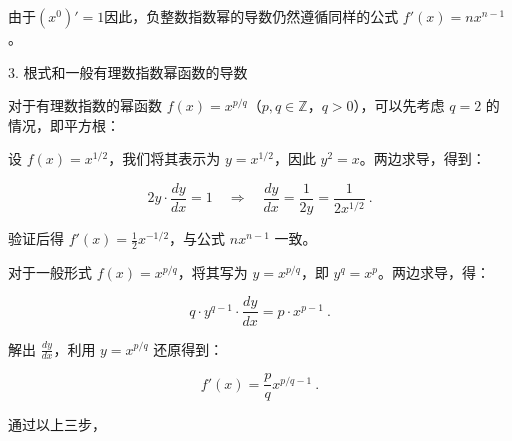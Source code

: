 由于$(x^0)'=1$因此，负整数指数幂的导数仍然遵循同样的公式 $f'(x) = nx^{n-1}$。

3. 根式和一般有理数指数幂函数的导数

对于有理数指数的幂函数 $f(x) = x^{p/q}$（$p, q \in \mathbb{Z}$，$q > 0$），可以先考虑 $q=2$ 的情况，即平方根：

设 $f(x) = x^{1/2}$，我们将其表示为 $y = x^{1/2}$，因此 $y^2 = x$。两边求导，得到：

$$
2y \cdot \frac{dy}{dx} = 1 \quad \Rightarrow \quad \frac{dy}{dx} = \frac{1}{2y} = \frac{1}{2x^{1/2}}~.
$$

验证后得 $f'(x) = \frac{1}{2}x^{-1/2}$，与公式 $nx^{n-1}$ 一致。

对于一般形式 $f(x) = x^{p/q}$，将其写为 $y = x^{p/q}$，即 $y^q = x^p$。两边求导，得：

$$
q \cdot y^{q-1} \cdot \frac{dy}{dx} = p \cdot x^{p-1}~.
$$

解出 $\frac{dy}{dx}$，利用 $y = x^{p/q}$ 还原得到：

$$
f'(x) = \frac{p}{q}x^{p/q - 1}~.
$$

通过以上三步，
